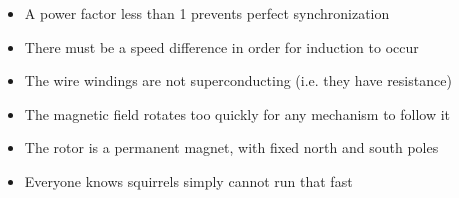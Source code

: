 \begin{itemize}
\item{} A power factor less than 1 prevents perfect synchronization
\vskip 5pt 
\item{} There must be a speed difference in order for induction to occur
\vskip 5pt 
\item{} The wire windings are not superconducting (i.e. they have resistance)
\vskip 5pt 
\item{} The magnetic field rotates too quickly for any mechanism to follow it
\vskip 5pt 
\item{} The rotor is a permanent magnet, with fixed north and south poles
\vskip 5pt 
\item{} Everyone knows squirrels simply cannot run that fast
\end{itemize}




